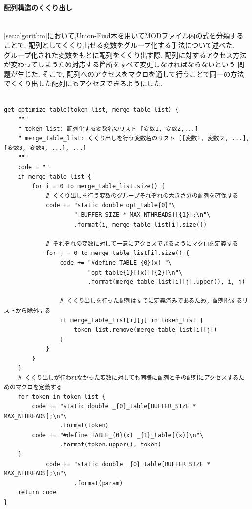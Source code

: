\paragraph{配列構造のくくり出し}~\\
\ref{sec:algorithm}において,Union-Find木を用いてMODファイル内の式を分類することで,
配列としてくくり出せる変数をグループ化する手法について述べた.\\
グループ化された変数をもとに配列をくくり出す際, 配列に対するアクセス方法が変わってしまうため対応する箇所をすべて変更しなければならないという
問題が生じた. そこで, 配列へのアクセスをマクロを通して行うことで同一の方法でくくり出した配列にもアクセスできるようにした.\\
{\footnotesize
\begin{lstlisting}[caption=計算式内の変数の配列化,label=obtain-vars,numbers=none]

get_optimize_table(token_list, merge_table_list) {
    """
    " token_list: 配列化する変数名のリスト [変数1, 変数2,...]
    " merge_table_list: くくり出しを行う変数名のリスト [[変数1, 変数２, ...], [変数3, 変数4, ...], ...]
    """
    code = ""
    if merge_table_list {
        for i = 0 to merge_table_list.size() {
            # くくり出しを行う変数のグループそれぞれの大きさ分の配列を確保する
            code += "static double opt_table{0}"\
                    "[BUFFER_SIZE * MAX_NTHREADS][{1}];\n"\
                    .format(i, merge_table_list[i].size())

            # それぞれの変数に対して一意にアクセスできるようにマクロを定義する
            for j = 0 to merge_table_list[i].size() {
                code += "#define TABLE_{0}(x) "\
                        "opt_table{1}[(x)][{2}]\n"\
                        .format(merge_table_list[i][j].upper(), i, j)

                # くくり出しを行った配列はすでに定義済みであるため, 配列化するリストから除外する
                if merge_table_list[i][j] in token_list {
                    token_list.remove(merge_table_list[i][j])
                }
            }
        }
    }
    # くくり出しが行われなかった変数に対しても同様に配列とその配列にアクセスするためのマクロを定義する
    for token in token_list {
        code += "static double _{0}_table[BUFFER_SIZE * MAX_NTHREADS];\n"\
                .format(token)
        code += "#define TABLE_{0}(x) _{1}_table[(x)]\n"\
                .format(token.upper(), token)
    }
            code += "static double _{0}_table[BUFFER_SIZE * MAX_NTHREADS];\n"\
                    .format(param)
    return code
}


\end{lstlisting}}
